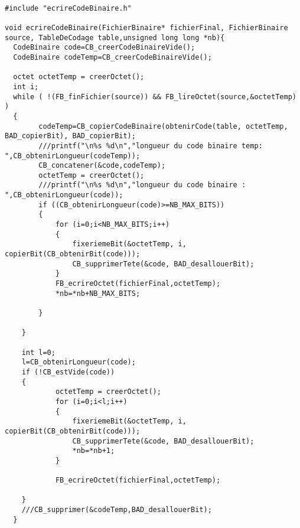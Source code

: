\begin{verbatim}

#include "ecrireCodeBinaire.h"

void ecrireCodeBinaire(FichierBinaire* fichierFinal, FichierBinaire source, TableDeCodage table,unsigned long long *nb){
  CodeBinaire code=CB_creerCodeBinaireVide();
  CodeBinaire codeTemp=CB_creerCodeBinaireVide();

  octet octetTemp = creerOctet();
  int i;
  while ( !(FB_finFichier(source)) && FB_lireOctet(source,&octetTemp) )
  {
		codeTemp=CB_copierCodeBinaire(obtenirCode(table, octetTemp, BAD_copierBit), BAD_copierBit);
		///printf("\n%s %d\n","longueur du code binaire temp: ",CB_obtenirLongueur(codeTemp));
		CB_concatener(&code,codeTemp);
		octetTemp = creerOctet();
		///printf("\n%s %d\n","longueur du code binaire : ",CB_obtenirLongueur(code));
		if ((CB_obtenirLongueur(code)>=NB_MAX_BITS))
		{
			for (i=0;i<NB_MAX_BITS;i++)
			{
				fixeriemeBit(&octetTemp, i, copierBit(CB_obtenirBit(code)));
				CB_supprimerTete(&code, BAD_desallouerBit);
			}
			FB_ecrireOctet(fichierFinal,octetTemp);
			*nb=*nb+NB_MAX_BITS;

		}

	}
	
	int l=0;
	l=CB_obtenirLongueur(code);
	if (!CB_estVide(code))
	{
			octetTemp = creerOctet();
			for (i=0;i<l;i++)
			{
				fixeriemeBit(&octetTemp, i, copierBit(CB_obtenirBit(code)));
				CB_supprimerTete(&code, BAD_desallouerBit);
				*nb=*nb+1;
			}
		
			FB_ecrireOctet(fichierFinal,octetTemp);
			
	}
	///CB_supprimer(&codeTemp,BAD_desallouerBit);
  }

\end{verbatim}
 
